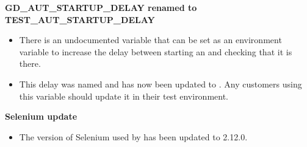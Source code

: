\textbf{GD\_AUT\_STARTUP\_DELAY renamed to TEST\_AUT\_STARTUP\_DELAY}\\
\begin{itemize}
\item There is an undocumented variable that can be set as an environment variable to increase the delay between starting an \gdaut{} and checking that it is there.
\item This delay was named  and has now been updated to . Any customers using this variable should update it in their test environment. 
\end{itemize}

\textbf{Selenium update}
\begin{itemize}
\item The version of Selenium used by \app{} has been updated to 2.12.0.
\end{itemize}
